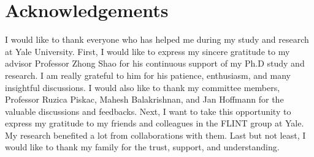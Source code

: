 \chapter{Acknowledgements} %
\thispagestyle{empty}
I would like to thank everyone who has helped me during my
study and research at Yale University.
First, I would like to express my sincere gratitude to my
advisor Professor Zhong Shao for his continuous support of my
Ph.D study and research. I am really grateful to him for his
patience, enthusiasm, and many insightful discussions.
I would also like to thank my committee members, Professor
Ruzica Piskac, Mahesh Balakrishnan, and Jan Hoffmann for
the valuable discussions and feedbacks. 
Next, I want to take this opportunity to express my gratitude
to my friends and colleagues in the FLINT group at Yale.
My research benefited a lot from collaborations with them.
Last but not least, I would like to thank my family for the
trust, support, and understanding.

\clearpage
